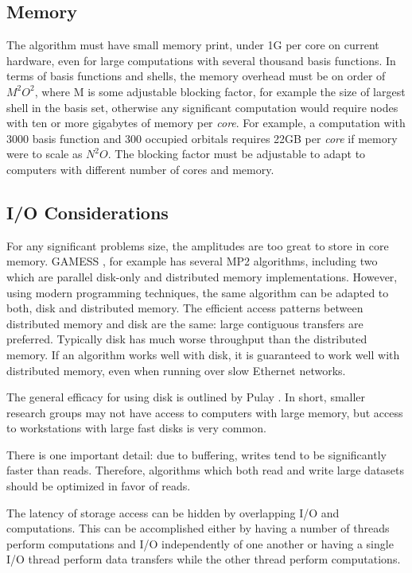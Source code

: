 \documentclass[12pt]{article} \usepackage[margin=1in]{geometry}
\begin{document}
\subsection {Memory}
The algorithm must have small memory print, under 1G per core on
current hardware, even for large computations with several thousand
basis functions.  In terms of basis functions and shells, the memory
overhead must be on order of $M^2O^2$, where M is some adjustable
blocking factor, for example the size of largest shell in the basis
set, otherwise any significant computation would require nodes with
ten or more gigabytes of memory per {\it core}.  For example, a
computation with 3000 basis function and 300 occupied orbitals
requires 22GB per {\it core} if memory were to scale as $N^2O$.  The
blocking factor must be adjustable to adapt to computers with
different number of cores and memory.

\subsection {I/O Considerations}
For any significant problems size, the amplitudes are too great to
store in core memory.  GAMESS \cite{gamess}, for example has several MP2 algorithms,
including two which are parallel disk-only \cite{ishimura2006new}
and distributed memory \cite{fletcher1997parallel}
implementations.  However, using modern programming techniques, the
same algorithm can be adapted to both, disk and distributed memory.
The efficient access patterns between distributed memory and disk are
the same: large contiguous transfers are preferred.  Typically disk
has much worse throughput than the distributed memory.  If an
algorithm works well with disk, it is guaranteed to work well with
distributed memory, even when running over slow Ethernet networks.

The general efficacy for using disk is outlined by Pulay \cite{ford2007array}.
  In short,
smaller research groups may not have access to computers with large
memory, but access to workstations with large fast disks is very common.

There is one important detail: due to buffering, writes tend to be
significantly faster than reads.  Therefore, algorithms which both
read and write large datasets should be optimized in favor of reads.

The latency of storage access can be hidden by overlapping I/O and
computations.  This can be accomplished either by having a number of
threads perform computations and I/O independently of one another or
having a single I/O thread perform data transfers while the other
thread perform computations.
\end{document}
